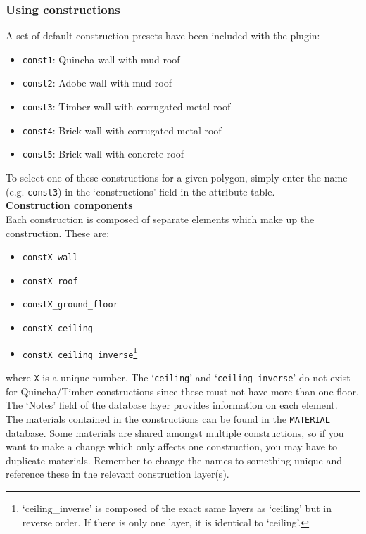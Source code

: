\documentclass{article}
\begin{document}
\subsubsection{Using constructions}
A set of default construction presets have been included with the plugin:
\begin{itemize}
    \item \texttt{const1}: Quincha wall with mud roof
    \item \texttt{const2}: Adobe wall with mud roof
    \item \texttt{const3}: Timber wall with corrugated metal roof
    \item \texttt{const4}: Brick wall with corrugated metal roof
    \item \texttt{const5}: Brick wall with concrete roof
\end{itemize}
To select one of these constructions for a given polygon, simply enter the name (e.g. \texttt{const3}) in the `constructions' field in the attribute table. \\

\textbf{Construction components} \\
Each construction is composed of separate elements which make up the construction. These are:
\begin{itemize}
    \item \texttt{constX\_wall}
    \item \texttt{constX\_roof}
    \item \texttt{constX\_ground\_floor}
    \item \texttt{constX\_ceiling}
    \item \texttt{constX\_ceiling\_inverse}\footnote{`ceiling\_inverse' is composed of the exact same layers as `ceiling' but in reverse order. If there is only one layer, it is identical to `ceiling'.}
\end{itemize}
where \texttt{X} is a unique number. The `\texttt{ceiling}' and `\texttt{ceiling\_inverse}' do not exist for Quincha/Timber constructions since these must not have more than one floor. The `Notes' field of the database layer provides information on each element. \\

The materials contained in the constructions can be found in the \texttt{MATERIAL} database. Some materials are shared amongst multiple constructions, so if you want to make a change which only affects one construction, you may have to duplicate materials. Remember to change the names to something unique and reference these in the relevant construction layer(s). \\
\end{document}
